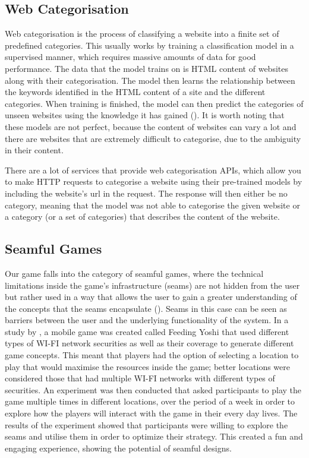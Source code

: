 \documentclass{l4proj}
\begin{document}
\subsection{Web Categorisation}
Web categorisation is the process of classifying a website into a finite set of predefined categories. This usually works by training a classification model in a supervised manner, which requires massive amounts of data for good performance. The data that the model trains on is HTML content of websites along with their categorisation. The model then learns the relationship between the keywords identified in the HTML content of a site and the different categories. When training is finished, the model can then predict the categories of unseen websites using the knowledge it has gained (\cite{webcat}). It is worth noting that these models are not perfect, because the content of websites can vary a lot and there are websites that are extremely difficult to categorise, due to the ambiguity in their content. 

There are a lot of services that provide web categorisation APIs, which allow you to make HTTP requests to categorise a website using their pre-trained models by including the website's url in the request. The response will then either be no category, meaning that the model was not able to categorise the given website or a category (or a set of categories) that describes the content of the website.

\subsection{Seamful Games}
Our game falls into the category of seamful games, where the technical limitations inside the game's infrastructure (seams) are not hidden from the user but rather used in a way that allows the user to gain a greater understanding of the concepts that the seams encapsulate (\cite{seams1}). Seams in this case can be seen as barriers between the user and the underlying functionality of the system. In a study by \cite{yoshi}, a mobile game was created called Feeding Yoshi that used different types of WI-FI network securities as well as their coverage to generate different game concepts. This meant that players had the option of selecting a location to play that would maximise the resources inside the game; better locations were considered those that had multiple WI-FI networks with different types of securities. An experiment was then conducted that asked participants to play the game multiple times in different locations, over the period of a week in order to explore how the players will interact with the game in their every day lives. The results of the experiment showed that participants were willing to explore the seams and utilise them in order to optimize their strategy. This created a fun and engaging experience, showing the potential of seamful designs.
\end{document}
